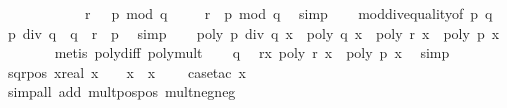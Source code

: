 \begin{isabellebody}
\ \ \ \ \ \ \ \ \ \ \ {\isacharparenleft}\ {\isachardoublequoteopen}{\isacharquery}r\ {\isacharequal}\ {\isacharminus}\ {\isacharparenleft}{\isacharquery}p\ mod\ {\isacharquery}q{\isacharparenright}{\isachardoublequoteclose}{\isacharparenright}\ \isacommand{{\isachardot}}\isamarkupfalse%
\isanewline
\ \ \isamarkupfalse%
\ {\isachardoublequoteopen}{\isacharminus}{\isacharquery}r\ {\isacharequal}\ {\isacharquery}p\ mod\ {\isacharquery}q{\isachardoublequoteclose}\ \isamarkupfalse%
\ simp\isanewline
\ \ \isamarkupfalse%
\ mod{\isacharunderscore}div{\isacharunderscore}equality{\isacharbrackleft}of\ {\isacharquery}p\ {\isacharquery}q{\isacharbrackright}\ \isamarkupfalse%
\ {\isachardoublequoteopen}{\isacharquery}p\ div\ {\isacharquery}q\ {\isacharasterisk}\ {\isacharquery}q\ {\isacharminus}\ {\isacharquery}r\ {\isacharequal}\ {\isacharquery}p{\isachardoublequoteclose}\ \isamarkupfalse%
\ simp\isanewline
\ \ \isamarkupfalse%
\ {\isachardoublequoteopen}poly\ {\isacharparenleft}{\isacharquery}p\ div\ {\isacharquery}q{\isacharparenright}\ x\ {\isacharasterisk}\ poly\ {\isacharquery}q\ x\ {\isacharminus}\ poly\ {\isacharquery}r\ x\ {\isacharequal}\ poly\ {\isacharquery}p\ x{\isachardoublequoteclose}\isanewline
\ \ \ \ \ \ \isamarkupfalse%
\ {\isacharparenleft}metis\ poly{\isacharunderscore}diff\ poly{\isacharunderscore}mult{\isacharparenright}\isanewline
\ \ \isamarkupfalse%
\ q{\isacharunderscore}{}\ \isamarkupfalse%
\ r{\isacharunderscore}x{\isacharcolon}\ {\isachardoublequoteopen}poly\ {\isacharquery}r\ x\ {\isacharequal}\ {\isacharminus}poly\ {\isacharquery}p\ x{\isachardoublequoteclose}\ \isamarkupfalse%
\ simp\isanewline
\ \ \isamarkupfalse%
\ \isamarkupfalse%
\ sqr{\isacharunderscore}pos{\isacharcolon}\ {\isachardoublequoteopen}{\isasymAnd}x{\isacharcolon}{\isacharcolon}real{\isachardot}\ x\ {\isasymnoteq}\ {}\ {\isasymLongrightarrow}\ x\ {\isacharasterisk}\ x\ {\isachargreater}\ {}{\isachardoublequoteclose}\ \isamarkupfalse%
\ {\isacharparenleft}case{\isacharunderscore}tac\ {\isachardoublequoteopen}x\ {\isasymge}\ {}{\isachardoublequoteclose}{\isacharparenright}\isanewline
\ \ \ \ \ \ \isamarkupfalse%
\ {\isacharparenleft}simp{\isacharunderscore}all\ add{\isacharcolon}\ mult{\isacharunderscore}pos{\isacharunderscore}pos\ mult{\isacharunderscore}neg{\isacharunderscore}neg{\isacharparenright}\isanewline

\end{isabellebody}
